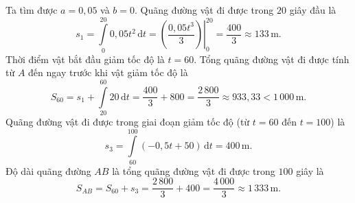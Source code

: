 \begin{ex}
{\begin{center}
		\end{center}
		\begin{itemchoice}
			\itemch Ta tìm được $a=0{,}05$ và $b=0$.
			\itemch Quãng đường vật đi được trong $20$ giây đầu là
			\[ s_1 = \displaystyle\int\limits_{0}^{20} 0{,}05t^2 \mathrm{\,d}t = \left. \left( \dfrac{0{,}05t^3}{3} \right) \right|_0^{20} = \dfrac{400}{3} \approx 133\mathrm{\,m}. \]
			\itemch Thời điểm vật bắt đầu giảm tốc độ là $t=60$. Tổng quãng đường vật đi được tính từ $A$ đến ngay trước khi vật giảm tốc độ là
			\[ S_{60} = s_1 + \displaystyle\int\limits_{20}^{60} 20 \mathrm{\,d}t = \dfrac{400}{3}+800=\dfrac{2\,800}{3} \approx 933{,}33<1\,000\mathrm{\,m}. \]
			\itemch Quãng đường vật đi được trong giai đoạn giảm tốc độ (từ $t=60$ đến $t=100$) là
			\[ s_3 = \displaystyle\int\limits_{60}^{100} (-0{,}5t + 50) \mathrm{\,d}t = 400\mathrm{\,m}. \]
			Độ dài quãng đường $AB$ là tổng quãng đường vật đi được trong $100$ giây là
			\[ S_{AB} = S_{60} + s_3 = \dfrac{2\,800}{3} + 400 = \dfrac{4\,000}{3} \approx 1\,333\mathrm{\,m}. \]
		\end{itemchoice}
	}
\end{ex}
\caukq 
